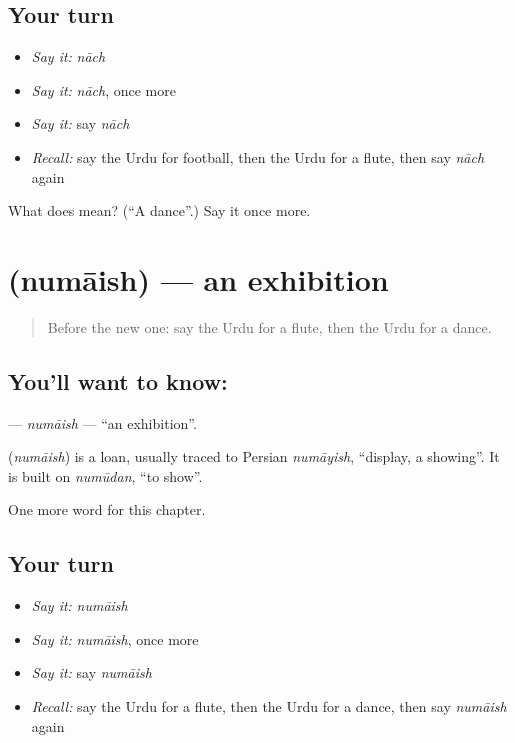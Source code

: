 \subsection*{Your turn}
\begin{itemize}
\raggedright
  \item \emph{Say it:} \emph{nāch}
  \item \emph{Say it:} \emph{nāch}, once more
  \item \emph{Say it:} say \emph{nāch}
  \item \emph{Recall:} say the Urdu for football, then the Urdu for a flute, then say \emph{nāch} again
\end{itemize}

\begin{tcolorbox}[breakable,colback=teal!4,colframe=teal!35!black,title={Before you move on}]
What does  mean? (\textquotedblleft{}A dance\textquotedblright{}.) Say it once more.
\end{tcolorbox}
\section[\texorpdfstring{\ur{نمائش} (numāish)}{نمائش (numāish)}]{ (numāish) — an exhibition}

\label{lesson:UR-C169-numaish}



\begin{quote}
Before the new one: say the Urdu for a flute, then the Urdu for a dance.
\end{quote}

\subsection*{You'll want to know: }
\textbf{} — \emph{numāish} — \textquotedblleft{}an exhibition\textquotedblright{}.

\begin{cousinweb}
\textbf{} (\emph{numāish}) is a loan, usually traced to Persian \emph{numāyish}, \textquotedblleft{}display, a showing\textquotedblright{}. It is built on \emph{numūdan}, \textquotedblleft{}to show\textquotedblright{}.
\end{cousinweb}

\begin{grammarlens}[title={What you've built}]
One more word for this chapter.
\end{grammarlens}

\subsection*{Your turn}
\begin{itemize}
\raggedright
  \item \emph{Say it:} \emph{numāish}
  \item \emph{Say it:} \emph{numāish}, once more
  \item \emph{Say it:} say \emph{numāish}
  \item \emph{Recall:} say the Urdu for a flute, then the Urdu for a dance, then say \emph{numāish} again
\end{itemize}

